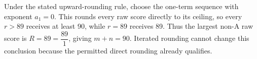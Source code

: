 Under the stated upward-rounding rule, choose the one-term sequence with exponent $a_1=0$. This rounds every raw score directly to its ceiling, so every $r>89$ receives at least 90, while $r=89$ receives 89. Thus the largest non-A raw score is $R = 89 = \dfrac{89}{1}$, giving $\boxed{m+n=90}$. Iterated rounding cannot change this conclusion because the permitted direct rounding already qualifies.
